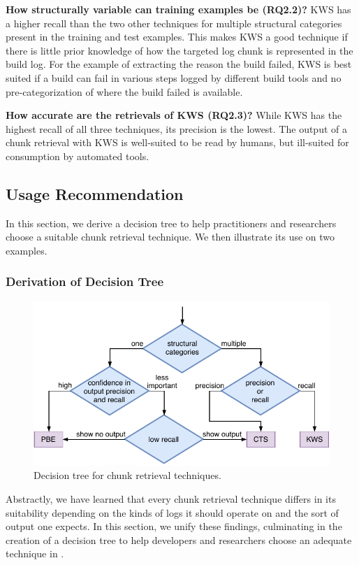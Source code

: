 \noindent
\textbf{How structurally variable can training examples be (RQ2.2)?}
KWS has a higher recall than the two other techniques for multiple
structural categories present in the training and test examples.
This
makes KWS a good technique if there is little prior knowledge of how
the targeted log chunk is represented in the build log.
For the
example of extracting the reason the build failed, KWS is best suited
if a build can fail in various steps logged by different build
tools and no
pre-categorization of where the build failed is available.

\noindent
\textbf{How accurate are the retrievals of KWS (RQ2.3)?}
While KWS has the highest recall of all three techniques, its
precision is the lowest.
The output of a chunk retrieval with KWS is
well-suited to be read by humans, but ill-suited for consumption by
automated tools.


\subsection{Usage Recommendation}
In this section, we derive a decision tree to help practitioners and
researchers choose a suitable chunk retrieval technique.
We then
illustrate its use on two examples.

\subsubsection{Derivation of Decision Tree}
\begin{figure}[bt]
		\centering
		\includegraphics[width=0.8\columnwidth,
		clip]{img/crt-recommendation.pdf}
		\caption{Decision tree for chunk
		retrieval techniques.}
		\label{fig:crt-recommendation}
\end{figure}

Abstractly, we have learned that every chunk retrieval technique
differs in its suitability depending on the kinds of logs it should
operate on and the sort of output one expects.
In this section, we
unify these findings, culminating in the creation of a decision tree
to help developers and researchers choose an adequate technique in
.

